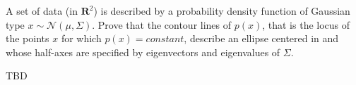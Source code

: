 \Exercise[number={2}]
A set of data (in \(\mathbf{R}^2\)) is described by a probability density
function of Gaussian type \(x \sim \mathcal{N}(\mu, \Sigma)\). Prove that
the contour lines of \(p(x)\), that is the locus of the points \(x\) for
which \(p(x) = constant\), describe an ellipse centered in and whose
half-axes are specified by eigenvectors and eigenvalues of \(\Sigma\).

\Answer[number={2}]
TBD